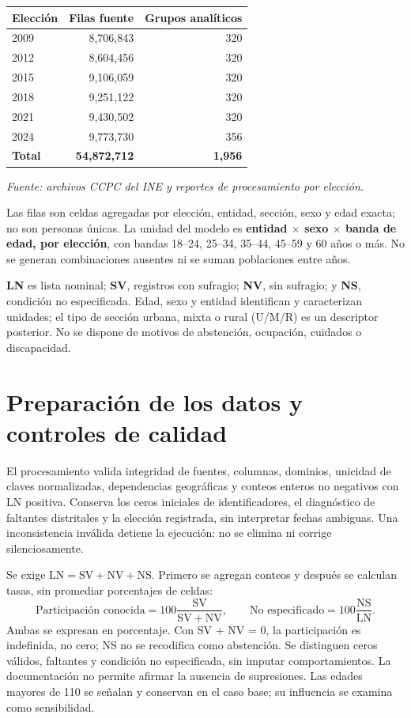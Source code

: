 \documentclass[11pt]{article}
\begin{document}
\begingroup
\centering
\begin{tabular}{@{}lrr@{}}
\hline
\textbf{Elección} & \textbf{Filas fuente} & \textbf{Grupos analíticos} \\ \hline
2009 & 8,706,843 & 320 \\
2012 & 8,604,456 & 320 \\
2015 & 9,106,059 & 320 \\
2018 & 9,251,122 & 320 \\
2021 & 9,430,502 & 320 \\
2024 & 9,773,730 & 356 \\
\textbf{Total} & \textbf{54,872,712} & \textbf{1,956} \\ \hline
\end{tabular}\par
\endgroup
\textit{Fuente: archivos CCPC del INE y reportes de procesamiento por elección.}

Las filas son celdas agregadas por elección, entidad, sección, sexo y edad exacta; no son personas únicas. La unidad del modelo es \textbf{entidad $\times$ sexo $\times$ banda de edad, por elección}, con bandas 18--24, 25--34, 35--44, 45--59 y 60 años o más. No se generan combinaciones ausentes ni se suman poblaciones entre años.

\textbf{LN} es lista nominal; \textbf{SV}, registros con sufragio; \textbf{NV}, sin sufragio; y \textbf{NS}, condición no especificada. Edad, sexo y entidad identifican y caracterizan unidades; el tipo de sección urbana, mixta o rural (U/M/R) es un descriptor posterior. No se dispone de motivos de abstención, ocupación, cuidados o discapacidad.

\section{Preparación de los datos y controles de calidad}

El procesamiento valida integridad de fuentes, columnas, dominios, unicidad de claves normalizadas, dependencias geográficas y conteos enteros no negativos con LN positiva. Conserva los ceros iniciales de identificadores, el diagnóstico de faltantes distritales y la elección registrada, sin interpretar fechas ambiguas. Una inconsistencia inválida detiene la ejecución: no se elimina ni corrige silenciosamente.

Se exige $\mathrm{LN}=\mathrm{SV}+\mathrm{NV}+\mathrm{NS}$. Primero se agregan conteos y después se calculan tasas, sin promediar porcentajes de celdas:
\[
\text{Participación conocida}=100\frac{\mathrm{SV}}{\mathrm{SV}+\mathrm{NV}},
\qquad
\text{No especificado}=100\frac{\mathrm{NS}}{\mathrm{LN}}.
\]
Ambas se expresan en porcentaje. Con SV + NV = 0, la participación es indefinida, no cero; NS no se recodifica como abstención. Se distinguen ceros válidos, faltantes y condición no especificada, sin imputar comportamientos. La documentación no permite afirmar la ausencia de supresiones. Las edades mayores de 110 se señalan y conservan en el caso base; su influencia se examina como sensibilidad.
\end{document}
